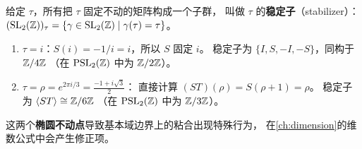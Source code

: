 给定 $\tau$，所有把 $\tau$ 固定不动的矩阵构成一个子群，
叫做 $\tau$ 的\textbf{稳定子}（stabilizer）：
$(\mathrm{SL}_2(\mathbb{Z}))_\tau = \{\gamma \in \mathrm{SL}_2(\mathbb{Z}) \mid \gamma(\tau) = \tau\}$。

\begin{enumerate}
  \item $\tau = i$：$S(i) = -1/i = i$，所以 $S$ 固定 $i$。
    稳定子为 $\{I, S, -I, -S\}$，同构于 $\mathbb{Z}/4\mathbb{Z}$
    （在 $\mathrm{PSL}_2(\mathbb{Z})$ 中为 $\mathbb{Z}/2\mathbb{Z}$）。
  \item $\tau = \rho = e^{2\pi i/3} = \frac{-1+i\sqrt{3}}{2}$：
    直接计算 $(ST)(\rho) = S(\rho + 1) = \rho$。
    稳定子为 $\langle ST \rangle \cong \mathbb{Z}/6\mathbb{Z}$
    （在 $\mathrm{PSL}_2(\mathbb{Z})$ 中为 $\mathbb{Z}/3\mathbb{Z}$）。
\end{enumerate}
这两个\textbf{椭圆不动点}导致基本域边界上的粘合出现特殊行为，
在\cref{ch:dimension}的维数公式中会产生修正项。


